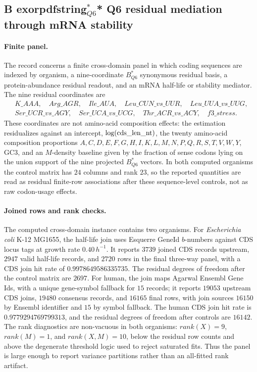 \subsection{B exorpdfstring{$^*_{Q6}$}{* Q6} residual mediation through mRNA stability}\label{sec:bioreality-q6-mrna-stability-mediation-crossdomain}

\paragraph{Finite panel.} The record concerns a finite cross-domain panel in which coding sequences are indexed by organism, a nine-coordinate $B^*_{Q6}$ synonymous residual basis, a protein-abundance residual readout, and an mRNA half-life or stability mediator.  The nine residual coordinates are
$$
\begin{aligned}
&K\_AAA,\quad Arg\_AGR,\quad Ile\_AUA,\quad Leu\_CUN\_vs\_UUR,\quad Leu\_UUA\_vs\_UUG,\\
&Ser\_UCR\_vs\_AGY,\quad Ser\_UCA\_vs\_UCG,\quad Thr\_ACR\_vs\_ACY,\quad f3\_stress.
\end{aligned}
$$
These coordinates are not amino-acid composition effects: the estimation residualizes against an intercept, $\log({\rm cds\_len\_nt})$, the twenty amino-acid composition proportions $A,C,D,E,F,G,H,I,K,L,M,N,P,Q,R,S,T,V,W,Y$, GC3, and an $M$-density baseline given by the fraction of sense codons lying on the union support of the nine projected $B^*_{Q6}$ vectors.  In both computed organisms the control matrix has $24$ columns and rank $23$, so the reported quantities are read as residual finite-row associations after these sequence-level controls, not as raw codon-usage effects.

\paragraph{Joined rows and rank checks.} The computed cross-domain instance contains two organisms.  For \emph{Escherichia coli} K-12 MG1655, the half-life join uses Esquerre GeneId $b$-numbers against CDS locus tags at growth rate $0.40\,h^{-1}$.  It reports $3739$ joined CDS records upstream, $2947$ valid half-life records, and $2720$ rows in the final three-way panel, with a CDS join hit rate of $0.9978649586335735$.  The residual degrees of freedom after the control matrix are $2697$.  For human, the join maps Agarwal Ensembl Gene Ids, with a unique gene-symbol fallback for $15$ records; it reports $19053$ upstream CDS joins, $19480$ consensus records, and $16165$ final rows, with join sources $16150$ by Ensembl identifier and $15$ by symbol fallback.  The human CDS join hit rate is $0.9779294769799313$, and the residual degrees of freedom after controls are $16142$.  The rank diagnostics are non-vacuous in both organisms: $rank(X)=9$, $rank(M)=1$, and $rank(X,M)=10$, below the residual row counts and above the degenerate threshold logic used to reject saturated fits.  Thus the panel is large enough to report variance partitions rather than an all-fitted rank artifact.

